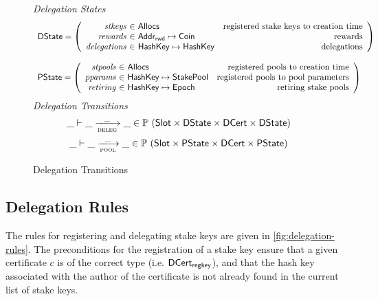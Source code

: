 \begin{figure}
  \emph{Delegation States}
  \begin{equation*}
    \begin{array}{l}
    \DState =
    \left(\begin{array}{r@{~\in~}lr}
      \var{stkeys} & \Allocs & \text{registered stake keys to creation time}\\
      \var{rewards} & \AddrRWD \mapsto \Coin & \text{rewards}\\
      \var{delegations} & \HashKey \mapsto \HashKey & \text{delegations}\\
    \end{array}\right)
    \\
    \\
    \PState =
    \left(\begin{array}{r@{~\in~}lr}
      \var{stpools} & \Allocs & \text{registered pools to creation time}\\
      \var{pparams} & \HashKey \mapsto \StakePool
        & \text{registered pools to pool parameters}\\
      \var{retiring} & \HashKey \mapsto \Epoch & \text{retiring stake pools}\\
    \end{array}\right)
    \end{array}
  \end{equation*}
  \emph{Delegation Transitions}
  \begin{equation*}
    \_ \vdash \_ \trans{deleg}{\_} \_ \in
      \powerset (\Slot \times \DState \times \DCert \times \DState)
  \end{equation*}
  \begin{equation*}
    \_ \vdash \_ \trans{pool}{\_} \_ \in
      \powerset (\Slot \times \PState \times \DCert \times \PState)
  \end{equation*}
  \caption{Delegation Transitions}
  \label{fig:delegation-transitions}
\end{figure}


\subsection{Delegation Rules}
\label{sec:deleg-rules}


The rules for registering and delegating stake keys are given in
\cref{fig:delegation-rules}. The preconditions for the registration of a stake
key ensure that a given certificate $c$ is of the correct type
(i.e. $\mathsf{DCert_{regkey}}$),
and that the hash key associated with the author of the certificate is not
already found in the current list of stake keys.

